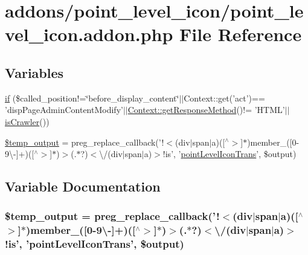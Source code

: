\hypertarget{point__level__icon_8addon_8php}{\section{addons/point\-\_\-level\-\_\-icon/point\-\_\-level\-\_\-icon.addon.\-php File Reference}
\label{point__level__icon_8addon_8php}
}
\subsection*{Variables}
\begin{DoxyCompactItemize}
\item 
\hyperlink{point__level__icon_8addon_8php_a29031816e50a8f742422e671b2bef9b2}{if} (\$called\-\_\-position!=\char`\"{}before\-\_\-display\-\_\-content\char`\"{}$|$$|$Context\-::get('act')== 'disp\-Page\-Admin\-Content\-Modify'$|$$|$\hyperlink{classContext_a1d02a15209360034cd719d8b08cb5061}{Context\-::get\-Response\-Method}()!= 'H\-T\-M\-L'$|$$|$\hyperlink{func_8inc_8php_a490ffbd4821da1995c76c381553d5b3d}{is\-Crawler}())
\item 
\hyperlink{point__level__icon_8addon_8php_a5866ef6f77cbeaf87d8208cf805bbc3d}{\$temp\-\_\-output} = preg\-\_\-replace\-\_\-callback('!$<$(div$|$span$|$a)(\mbox{[}$^\wedge$$>$\mbox{]}$\ast$)member\-\_\-(\mbox{[}0-\/9\textbackslash{}-\/\mbox{]}+)(\mbox{[}$^\wedge$$>$\mbox{]}$\ast$)$>$(.$\ast$?)$<$\textbackslash{}/(div$|$span$|$a)$>$!is', '\hyperlink{point__level__icon_8lib_8php_a6581bcaf11de4c31924e7a5de3d6887d}{point\-Level\-Icon\-Trans}', \$output)
\end{DoxyCompactItemize}


\subsection{Variable Documentation}
\hypertarget{point__level__icon_8addon_8php_a5866ef6f77cbeaf87d8208cf805bbc3d}{
\subsubsection[{\$temp\-\_\-output}]{\setlength{\rightskip}{0pt plus 5cm}\$temp\-\_\-output = preg\-\_\-replace\-\_\-callback('!$<$(div$|$span$|$a)(\mbox{[}$^\wedge$$>$\mbox{]}$\ast$)member\-\_\-(\mbox{[}0-\/9\textbackslash{}-\/\mbox{]}+)(\mbox{[}$^\wedge$$>$\mbox{]}$\ast$)$>$(.$\ast$?)$<$\textbackslash{}/(div$|$span$|$a)$>$!is', '{\bf point\-Level\-Icon\-Trans}', \$output)}}\label{point__level__icon_8addon_8php_a5866ef6f77cbeaf87d8208cf805bbc3d}


